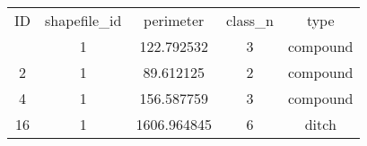 \begin{tabular}{ccccc}
    \toprule
    ID & shapefile\_id & perimeter & class\_n & type\\
    \otoprule
    1 & 1 & 122.792532 & 3 & compound\\
    2 & 1 & 89.612125 & 2 & compound\\
    4 & 1 & 156.587759 & 3 & compound\\
    16 & 1 & 1606.964845 & 6 & ditch\\
    \bottomrule
\end{tabular}
